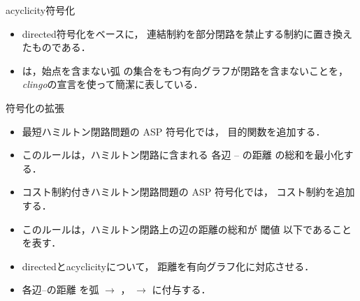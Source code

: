 \documentclass[dvipdfmx,10pt]{beamer}
\begin{document}
\begin{frame}{\textsf{acyclicity}符号化}
\begin{exampleblock}{}

\end{exampleblock}
\begin{itemize}
\item \textsf{directed}符号化をベースに，
      連結制約を部分閉路を禁止する制約に置き換えたものである．
\item {}は，始点を含まない弧
      の集合をもつ有向グラフが閉路を含まないことを，
      \textit{clingo}の宣言を使って簡潔に表している．
\end{itemize}
\end{frame}
\begin{frame}[noframenumbering]{符号化の拡張}
\begin{itemize}
\begin{exampleblock}{}
 
\end{exampleblock}
  \item \alert{最短ハミルトン閉路問題}の ASP 符号化では，
	目的関数を追加する．
  \item このルールは，ハミルトン閉路に含まれる
	各辺  –  の距離  
	の総和を最小化する．
\begin{exampleblock}{}

\end{exampleblock}
  \item \alert{コスト制約付きハミルトン閉路問題}の ASP 符号化では，
	コスト制約を追加する．
  \item このルールは，ハミルトン閉路上の辺の距離の総和が
	閾値  以下であることを表す．
\begin{exampleblock}{}

\end{exampleblock}
  \item \textsf{directed}と\textsf{acyclicity}について，
	距離を有向グラフ化に対応させる．
  \item 各辺–の距離  を弧 $\rightarrow$ ，
	 $\rightarrow$ に付与する．
\end{itemize}
\end{frame}
\end{document}
